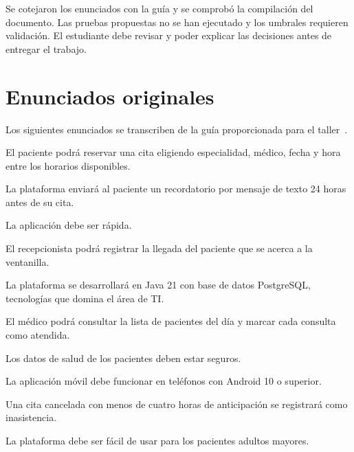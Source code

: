 \documentclass[11pt,a4paper]{article}
\begin{document}
Se cotejaron los enunciados con la guía y se comprobó la compilación
del documento. Las pruebas propuestas no se han ejecutado y los
umbrales requieren validación. El estudiante debe revisar y poder
explicar las decisiones antes de entregar el trabajo.




\clearpage
\appendix

\section{Enunciados originales}

Los siguientes enunciados se transcriben de la guía proporcionada
para el taller~\cite{guia}.

\begin{description}[
    style=standard,
    leftmargin=1.15cm,
    labelwidth=0.95cm,
    itemsep=6pt
]

\item[E01]
El paciente podrá reservar una cita eligiendo especialidad,
médico, fecha y hora entre los horarios disponibles.

\item[E02]
La plataforma enviará al paciente un recordatorio por mensaje
de texto 24 horas antes de su cita.

\item[E03]
La aplicación debe ser rápida.

\item[E04]
El recepcionista podrá registrar la llegada del paciente que
se acerca a la ventanilla.

\item[E05]
La plataforma se desarrollará en Java 21 con base de datos
PostgreSQL, tecnologías que domina el área de TI.

\item[E06]
El médico podrá consultar la lista de pacientes del día y marcar
cada consulta como atendida.

\item[E07]
Los datos de salud de los pacientes deben estar seguros.

\item[E08]
La aplicación móvil debe funcionar en teléfonos con
Android 10 o superior.

\item[E09]
Una cita cancelada con menos de cuatro horas de anticipación
se registrará como inasistencia.

\item[E10]
La plataforma debe ser fácil de usar para los pacientes adultos mayores.


\end{description}
\end{document}
